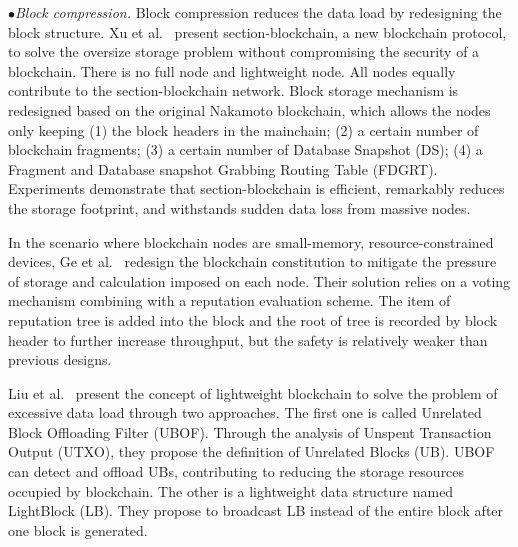 \documentclass[acmsmall]{acmart}
\begin{document}
$\bullet${\it Block compression.}
Block compression reduces the data load by redesigning the block structure. 
Xu et al.~\cite{xu2018section} present section-blockchain, a new blockchain protocol, to solve the oversize storage problem without compromising the security of a blockchain. There is no full node and lightweight node. All nodes equally contribute to the section-blockchain network. Block storage mechanism is redesigned based on the original Nakamoto blockchain, which allows the nodes only keeping (1) the block headers in the mainchain; (2) a certain number of blockchain fragments; (3) a certain number of Database Snapshot (DS); (4) a Fragment and Database snapshot Grabbing Routing Table (FDGRT). Experiments demonstrate that section-blockchain is efficient, remarkably reduces the storage footprint, and withstands sudden data loss from massive nodes.


In the scenario where blockchain nodes are small-memory, resource-constrained devices, Ge et al.~\cite{DBLP:journals/jsa/GeML20} redesign the blockchain constitution to mitigate the pressure of storage and calculation imposed on each node.
Their solution relies on a voting mechanism combining with a reputation evaluation scheme. The item of reputation tree is added into the block and the root of tree is recorded by block header to further increase throughput, but the safety is relatively weaker than previous designs.



Liu et al.~\cite{DBLP:journals/tii/LiuWLX19} present the concept of lightweight blockchain to solve the problem of excessive data load through two approaches. The first one is called Unrelated Block Offloading Filter (UBOF). Through the analysis of Unspent Transaction Output (UTXO), they propose the definition of Unrelated Blocks (UB). UBOF can detect and offload UBs, contributing to reducing the storage resources occupied by blockchain. The other is a lightweight data structure named LightBlock (LB). They propose to broadcast LB instead of the entire block after one block is generated.
\end{document}
